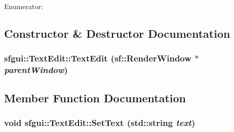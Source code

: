 \begin{Desc}
\item[Enumerator: ]\par
\begin{description}
\item[{\em 
\hypertarget{classsfgui_1_1TextEdit_f57eb4d7008c723b438197b3d0a126949acf4a0b80bbbc130112983c4d7c7988}{
ModePassword}
\label{classsfgui_1_1TextEdit_f57eb4d7008c723b438197b3d0a126949acf4a0b80bbbc130112983c4d7c7988}
}]\item[{\em 
\hypertarget{classsfgui_1_1TextEdit_f57eb4d7008c723b438197b3d0a12694e3840cc3f77909c7d436d3b904d9113a}{
ModeNormal}
\label{classsfgui_1_1TextEdit_f57eb4d7008c723b438197b3d0a12694e3840cc3f77909c7d436d3b904d9113a}
}]\end{description}
\end{Desc}



\subsection{Constructor \& Destructor Documentation}
\hypertarget{classsfgui_1_1TextEdit_c6f2d938ccf876f05a9a9c47060c6093}{
\subsubsection[TextEdit]{\setlength{\rightskip}{0pt plus 5cm}sfgui::TextEdit::TextEdit (sf::RenderWindow $\ast$ {\em parentWindow})}}
\label{classsfgui_1_1TextEdit_c6f2d938ccf876f05a9a9c47060c6093}




\subsection{Member Function Documentation}
\hypertarget{classsfgui_1_1TextEdit_c6f06a7dc81611a50226e10287e87e1e}{
\subsubsection[SetText]{\setlength{\rightskip}{0pt plus 5cm}void sfgui::TextEdit::SetText (std::string {\em text})}}
\label{classsfgui_1_1TextEdit_c6f06a7dc81611a50226e10287e87e1e}




